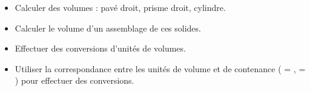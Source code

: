 \begin{prerequis}[Objectifs de 5\up{e}]  
    \begin{itemize}  
        \item Calculer des volumes : pavé droit, prisme droit, cylindre.
        \item Calculer le volume d'un assemblage de ces solides.        
        \item Effectuer des conversions d’unités de volumes.
        \columnbreak
        \item Utiliser la correspondance entre les unités de volume et de contenance ( =  ,  = ) pour effectuer des conversions.
    \end{itemize}
\end{prerequis}
